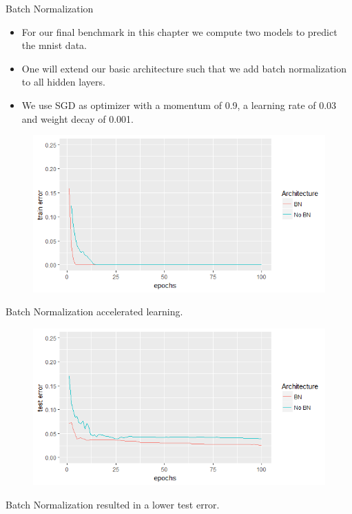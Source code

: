 \begin{vbframe}{Batch Normalization}
\begin{itemize}
    \item For our final benchmark in this chapter we compute two models to predict the mnist data.
    \item One will extend our basic architecture such that we add batch normalization to all hidden layers.
    \item We use SGD as optimizer with  a momentum of 0.9, a learning rate of 0.03 and weight decay of 0.001.
  \end{itemize}

\framebreak


  \begin{figure}
  \centering
    \includegraphics[width=12cm]{figure/bnTrain.png}
  \end{figure}
  Batch Normalization accelerated learning. 
  
  
\framebreak
  
  \begin{figure}
  \centering
    \includegraphics[width=12cm]{figure/bnTest.png}
  \end{figure}
  Batch Normalization resulted in a lower test error. 
\end{vbframe}

